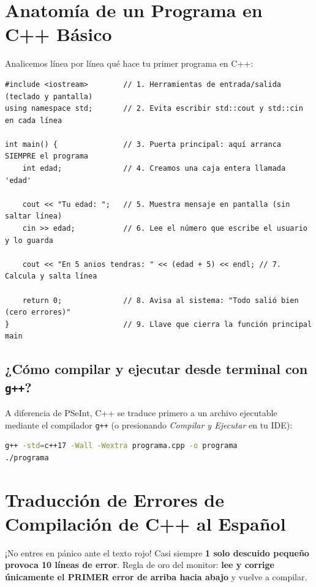 \documentclass[11pt,letterpaper]{article}
\begin{document}
\section{Anatomía de un Programa en C++ Básico}

Analicemos línea por línea qué hace tu primer programa en C++:

\begin{lstlisting}[style=cppmonitoria,caption={Radiografía de un programa mínimo en C++}]
#include <iostream>        // 1. Herramientas de entrada/salida (teclado y pantalla)
using namespace std;       // 2. Evita escribir std::cout y std::cin en cada línea

int main() {               // 3. Puerta principal: aquí arranca SIEMPRE el programa
    int edad;              // 4. Creamos una caja entera llamada 'edad'

    cout << "Tu edad: ";   // 5. Muestra mensaje en pantalla (sin saltar línea)
    cin >> edad;           // 6. Lee el número que escribe el usuario y lo guarda

    cout << "En 5 anios tendras: " << (edad + 5) << endl; // 7. Calcula y salta línea

    return 0;              // 8. Avisa al sistema: "Todo salió bien (cero errores)"
}                          // 9. Llave que cierra la función principal main
\end{lstlisting}

\subsection{¿Cómo compilar y ejecutar desde terminal con \texorpdfstring{\texttt{g++}}{g++}?}
A diferencia de PSeInt, C++ se traduce primero a un archivo ejecutable mediante el compilador \texttt{g++} (o presionando \textit{Compilar y Ejecutar} en tu IDE):
\begin{lstlisting}[style=monitoriaBaseCode,language=bash,numbers=none]
g++ -std=c++17 -Wall -Wextra programa.cpp -o programa
./programa
\end{lstlisting}

\section{Traducción de Errores de Compilación de C++ al Español}

\begin{peligro}{¡No entres en pánico ante el texto rojo!}
Casi siempre \textbf{1 solo descuido pequeño provoca 10 líneas de error}. Regla de oro del monitor: \textbf{lee y corrige únicamente el PRIMER error de arriba hacia abajo} y vuelve a compilar.
\end{peligro}
\end{document}
